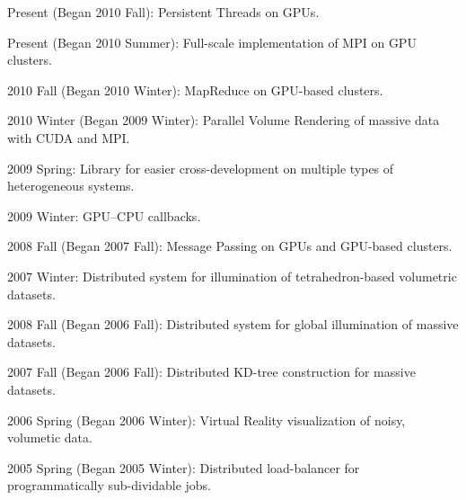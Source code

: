 Present (Began 2010 Fall): Persistent Threads on GPUs.

Present (Began 2010 Summer): Full-scale implementation of MPI on GPU clusters.

2010 Fall (Began 2010 Winter): MapReduce on GPU-based clusters.

2010 Winter (Began 2009 Winter): Parallel Volume Rendering of massive data with CUDA and MPI.

2009 Spring: Library for easier cross-development on multiple types of heterogeneous systems.

2009 Winter: GPU--CPU callbacks.

2008 Fall (Began 2007 Fall): Message Passing on GPUs and GPU-based clusters.

2007 Winter: Distributed system for illumination of tetrahedron-based volumetric datasets.

2008 Fall (Began 2006 Fall): Distributed system for global illumination of massive datasets.

2007 Fall (Began 2006 Fall): Distributed KD-tree construction for massive datasets.

2006 Spring (Began 2006 Winter): Virtual Reality visualization of noisy, volumetic data.

2005 Spring (Began 2005 Winter): Distributed load-balancer for programmatically sub-dividable jobs.
